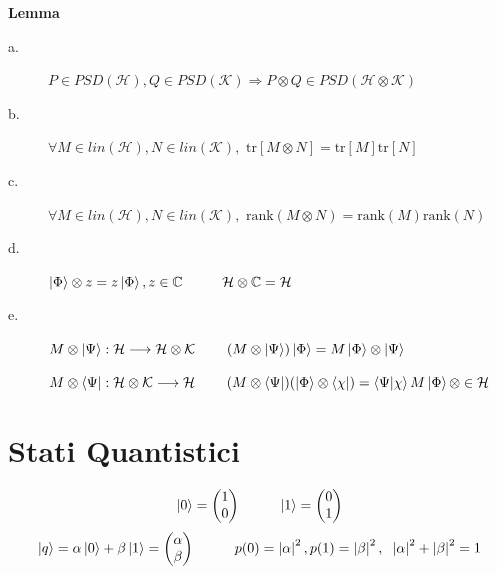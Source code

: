 \documentclass{report}
\begin{document}
\newpage
\textbf{Lemma}
\begin{description}
    \item[a.] $P \in \textit{PSD}(\mathcal{H}), Q \in \textit{PSD}(\mathcal{K}) \Rightarrow P \otimes Q \in \textit{PSD}(\mathcal{H}\otimes\mathcal{K})$
    \item[b.] $\forall M \in \textit{lin}(\mathcal{H}), N \in \textit{lin}(\mathcal{K}), \text{ tr}[M\otimes N] = \text{tr}[M]\text{tr}[N]$
    \item[c.] $\forall M \in \textit{lin}(\mathcal{H}), N \in \textit{lin}(\mathcal{K}), \text{ rank}(M\otimes N) = \text{rank}(M)\text{rank}(N)$
    \item[d.] $\ket{\Phi}\otimes z = z\ket{\Phi}, z \in \mathbb{C} \hspace{1cm}\mathcal{H} \otimes \mathbb{C}= \mathcal{H}$
    \item[e.] $M\otimes \ket{\Psi}: \mathcal{H} \longrightarrow \mathcal{H} \otimes \mathcal{K} \hspace{0.8cm} (M\otimes \ket{\Psi})\ket{\Phi} = M \ket{\Phi} \otimes \ket{\Psi}$
    
    \medskip
    $M\otimes \bra{\Psi}: \mathcal{H} \otimes \mathcal{K} \longrightarrow \mathcal{H} \hspace{0.8cm} (M\otimes \bra{\Psi}) (\ket{\Phi}\otimes\bra{\chi}) = \braket{\Psi|\chi} M \ket{\Phi} \otimes \in \mathcal{H}$
\end{description}

\section{Stati Quantistici}
$$\ket{0} = 
\begin{pmatrix}
    1 \\
    0 \\
\end{pmatrix}
\hspace{1cm}
\ket{1} = 
\begin{pmatrix}
    0 \\
    1 \\
\end{pmatrix}
$$
$$\ket{q} = \alpha\ket{0}+\beta\ket{1}=
\begin{pmatrix}
    \alpha \\
    \beta \\
\end{pmatrix}
\hspace{1cm} p(0)= \left|\alpha \right|^2, p(1)= \left|\beta \right|^2,\hspace{0.2cm} \left|\alpha \right|^2 +\left|\beta \right|^2 = 1
$$
\end{document}
